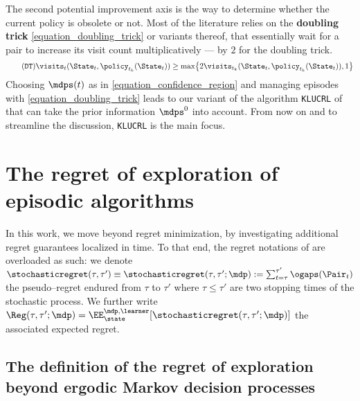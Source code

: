 \documentclass[preprint,cleveref,12pt]{colt2025}
\DeclarePairedDelimiter{\braces}{\{}{\}}	%
\def\model{\mdp}
\def\models{\mdps}
\newcommand{\strong}[1]{\textbf{#1}}
\begin{document}
    The second potential  improvement axis is the way to determine whether the current policy is obsolete or not.
    Most of the literature relies on the \strong{doubling trick} \eqref{equation_doubling_trick} or variants thereof, that essentially wait for a pair to increase its visit count multiplicatively --- by $2$ for the doubling trick.
    \begin{equation}
    \tag{\texttt{DT}}
    \label{equation_doubling_trick}
        \visits_t(\State_t, \policy_{t_k}(\State_t))
        \ge
        \max \braces[\big]{
            2 \visits_{t_k}(\State_t, \policy_{t_k}(\State_t))
            ,
            1
        }
    \end{equation}
    Choosing $\models(t)$ as in \eqref{equation_confidence_region} and managing episodes with \eqref{equation_doubling_trick} leads to our variant of the algorithm \texttt{KLUCRL} of \cite{filippi_optimism_2010} that can take the prior information $\models^0$ into account.
    From now on and to streamline the discussion, \texttt{KLUCRL} is the main focus. 

    \section{The regret of exploration of episodic algorithms}

    In this work, we move beyond regret minimization, by investigating additional regret guarantees localized in time. 
    To that end, the regret notations of  are overloaded as such: we denote $\stochasticregret(\tau, \tau') \equiv \stochasticregret(\tau, \tau'; \model) := \sum_{t=\tau}^{\tau'} \ogaps(\Pair_t)$ the pseudo--regret endured from $\tau$ to $\tau'$ where $\tau \le \tau'$ are two stopping times of the stochastic process. 
    We further write $\Reg(\tau, \tau'; \model) = \EE_{\state}^{\model, \learner}[\stochasticregret(\tau, \tau'; \model)]$ the associated expected regret. 

    \subsection{The definition of the regret of exploration beyond ergodic Markov decision processes}
\end{document}
